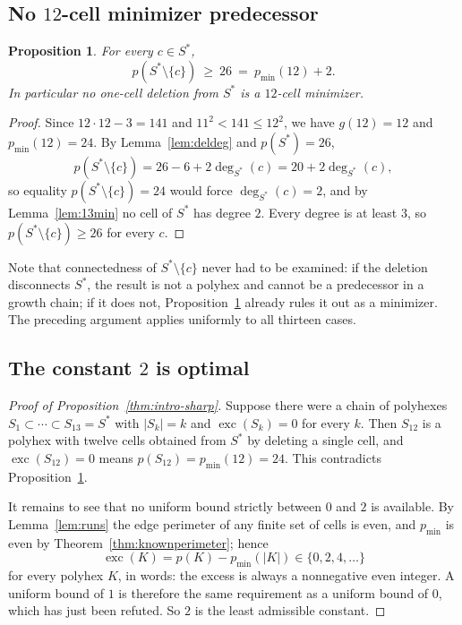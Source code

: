 \documentclass[11pt]{article}
\theoremstyle{plain}
\newtheorem{proposition}[theorem]{Proposition}
\theoremstyle{definition}
\theoremstyle{remark}
\newcommand{\sm}{\setminus}
\DeclareMathOperator{\exc}{exc}
\newcommand{\dg}{\operatorname{deg}}
\begin{document}
\subsection{No \texorpdfstring{\(12\)}{12}-cell minimizer predecessor}\label{sec:8.3}

\begin{proposition}\label{pro:nopred}
For every \(c\in S^{\ast}\),
\[
   p(S^{\ast}\sm\{c\})\ \ge\ 26\ =\ p_{\min}(12)+2 .
\]
In particular no one-cell deletion from \(S^{\ast}\) is a \(12\)-cell minimizer.
\end{proposition}

\begin{proof}
Since \(12\cdot12-3=141\) and \(11^{2}<141\le12^{2}\), we have \(g(12)=12\) and
\(p_{\min}(12)=24\). By Lemma~\ref{lem:deldeg} and \(p(S^{\ast})=26\),
\[
   p(S^{\ast}\sm\{c\})=26-6+2\dg_{S^{\ast}}(c)=20+2\dg_{S^{\ast}}(c),
\]
so equality \(p(S^{\ast}\sm\{c\})=24\) would force \(\dg_{S^{\ast}}(c)=2\), and by
Lemma~\ref{lem:13min} no cell of \(S^{\ast}\) has degree \(2\). Every degree is at least
\(3\), so \(p(S^{\ast}\sm\{c\})\ge26\) for every \(c\).
\end{proof}

Note that connectedness of \(S^{\ast}\sm\{c\}\) never had to be examined: if the deletion
disconnects \(S^{\ast}\), the result is not a polyhex and cannot be a predecessor in a
growth chain; if it does not, Proposition~\ref{pro:nopred} already rules it out as a
minimizer. The preceding argument applies uniformly to all thirteen cases.

\subsection{The constant \texorpdfstring{\(2\)}{2} is optimal}\label{sec:8.4}

\begin{proof}[Proof of Proposition~\ref{thm:intro-sharp}]
Suppose there were a chain of polyhexes \(S_{1}\subset\cdots\subset S_{13}=S^{*}\) with
\(|S_{k}|=k\) and \(\exc(S_{k})=0\) for every \(k\). Then \(S_{12}\) is a polyhex with twelve cells obtained from
\(S^{\ast}\) by deleting a single cell, and \(\exc(S_{12})=0\) means
\(p(S_{12})=p_{\min}(12)=24\). This contradicts Proposition~\ref{pro:nopred}.

It remains to see that no uniform bound strictly between \(0\) and \(2\) is available. By
Lemma~\ref{lem:runs} the edge perimeter of any finite set of cells is even, and
\(p_{\min}\) is even by Theorem~\ref{thm:knownperimeter}; hence
\[
   \exc(K)=p(K)-p_{\min}(|K|)\in\{0,2,4,\dots\}
\]
for every polyhex \(K\), in words: the excess is always a nonnegative even integer. A
uniform bound of \(1\) is therefore the same requirement as a uniform bound of \(0\), which
has just been refuted. So \(2\) is the least admissible constant.
\end{proof}
\end{document}
